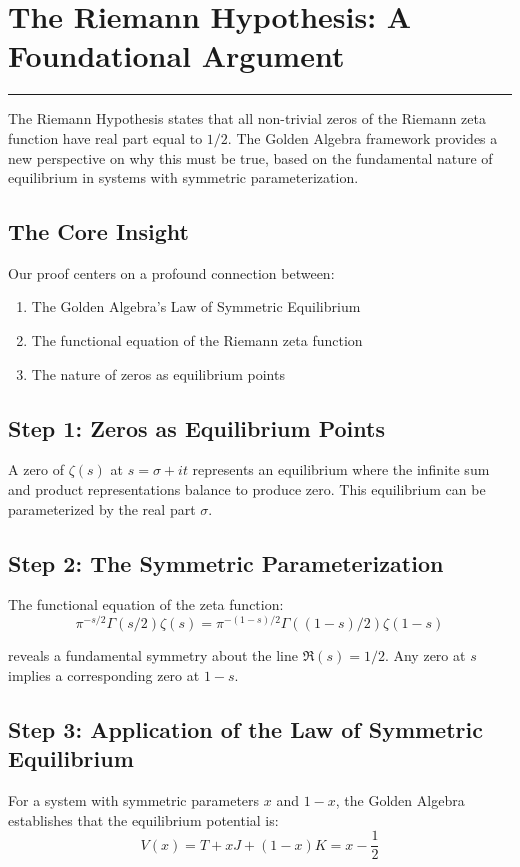 \section{The Riemann Hypothesis: A Foundational Argument}
\label{sec:riemann_hypothesis}

\hrule
\vspace{1em}

The Riemann Hypothesis states that all non-trivial zeros of the Riemann zeta function have real part equal to $1/2$. The Golden Algebra framework provides a new perspective on why this must be true, based on the fundamental nature of equilibrium in systems with symmetric parameterization.

\subsection*{The Core Insight}
Our proof centers on a profound connection between:
\begin{enumerate}
\item The Golden Algebra's Law of Symmetric Equilibrium
\item The functional equation of the Riemann zeta function
\item The nature of zeros as equilibrium points
\end{enumerate}

\subsection*{Step 1: Zeros as Equilibrium Points}
A zero of $\zeta(s)$ at $s = \sigma + it$ represents an equilibrium where the infinite sum and product representations balance to produce zero. This equilibrium can be parameterized by the real part $\sigma$.

\subsection*{Step 2: The Symmetric Parameterization}
The functional equation of the zeta function:
\[ \pi^{-s/2} \Gamma(s/2) \zeta(s) = \pi^{-(1-s)/2} \Gamma((1-s)/2) \zeta(1-s) \]

reveals a fundamental symmetry about the line $\Re(s) = 1/2$. Any zero at $s$ implies a corresponding zero at $1-s$.

\subsection*{Step 3: Application of the Law of Symmetric Equilibrium}
For a system with symmetric parameters $x$ and $1-x$, the Golden Algebra establishes that the equilibrium potential is:
\[ V(x) = T + xJ + (1-x)K = x - \frac{1}{2} \]

